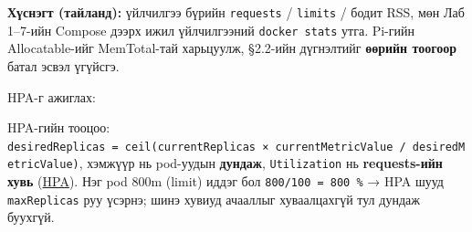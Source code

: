 \begin{Shaded}
\begin{Highlighting}[]
\OperatorTok{\textless{}}\OperatorTok{\textgreater{}} \KeywordTok{|} 
\OperatorTok{\textless{}}\OperatorTok{\textgreater{}} \KeywordTok{|} 
\KeywordTok{|} 
\end{Highlighting}
\end{Shaded}

\textbf{Хүснэгт (тайланд):} үйлчилгээ бүрийн \texttt{requests} / \texttt{limits} / бодит RSS, мөн Лаб 1--7-ийн Compose дээрх ижил үйлчилгээний \texttt{docker\ stats} утга. Pi-гийн Allocatable-ийг MemTotal-тай харьцуулж, §2.2-ийн дүгнэлтийг \textbf{өөрийн тоогоор} батал эсвэл үгүйсгэ.

HPA-г ажиглах:

\begin{Shaded}
\begin{Highlighting}[]
 \KeywordTok{\&}
\end{Highlighting}
\end{Shaded}

HPA-гийн тооцоо: \texttt{desiredReplicas\ =\allowbreak{}\ ceil(currentReplicas\ ×\ currentMetricValue\ /\allowbreak{}\ desiredMetricValue)}, хэмжүүр нь pod-уудын \textbf{дундаж}, \texttt{Utilization} нь \textbf{requests-ийн хувь} (\href{https://kubernetes.io/docs/concepts/workloads/autoscaling/horizontal-pod-autoscale/}{HPA}). Нэг pod 800m (limit) иддэг бол \texttt{800/\allowbreak{}100\ =\allowbreak{}\ 800\ \%} → HPA шууд \texttt{maxReplicas} руу үсэрнэ; шинэ хувиуд ачааллыг хуваалцахгүй тул дундаж буухгүй.

